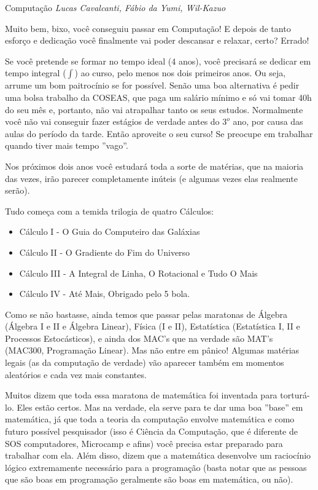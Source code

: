 \begin{subsecao}{Computação}
{\em Lucas Cavalcanti, Fábio da Yumi, Wil-Kazuo}

Muito bem, bixo, você conseguiu passar em Computação! E depois de tanto esforço
e dedicação você finalmente vai poder descansar e relaxar, certo? Errado!

Se você pretende se formar no tempo ideal (4 anos), você precisará se dedicar
em tempo integral ($\int$) ao curso, pelo menos nos dois primeiros anos. Ou
seja, arrume um bom paitrocínio se for possível. Senão uma boa alternativa é
pedir uma bolsa trabalho da COSEAS, que paga um salário mínimo e só vai
tomar 40h do seu mês e, portanto, não vai atrapalhar tanto os seus estudos.
Normalmente você não vai conseguir fazer estágios de verdade antes do $3^{o}$
ano, por causa das aulas do período da tarde. Então aproveite o seu curso! Se
preocupe em trabalhar quando tiver mais tempo ''vago''.

Nos próximos dois anos você estudará toda a sorte de matérias, que na maioria
das vezes, irão parecer completamente inúteis (e algumas vezes elas realmente
serão).

Tudo começa com a temida trilogia de quatro Cálculos:
\begin{itemize}
\item Cálculo I - O Guia do Computeiro das Galáxias
\item Cálculo II - O Gradiente do Fim do Universo
\item Cálculo III - A Integral de Linha, O Rotacional e Tudo O Mais
\item Cálculo IV - Até Mais, Obrigado pelo 5 bola.
\end{itemize}

Como se não bastasse, ainda temos que passar pelas maratonas
de Álgebra (Álgebra I e II e Álgebra Linear), Física (I e II),
Estatística (Estatística I, II e Processos Estocásticos), e ainda dos MAC's que
na verdade são MAT's (MAC300, Programação Linear). Mas não entre em pânico!
Algumas matérias legais (as da computação de verdade) vão aparecer também em
momentos aleatórios e cada vez mais constantes.

Muitos dizem que toda essa maratona de matemática foi inventada para
torturá-lo. Eles estão certos. Mas na verdade, ela serve para te dar uma
boa ''base'' em matemática, já que toda a teoria da computação envolve
matemática e como futuro possível pesquisador (isso é Ciência da Computação,
que é diferente de SOS computadores, Microcamp e afins) você precisa estar
preparado para trabalhar com ela. Além disso, dizem que a matemática desenvolve
um raciocínio lógico extremamente necessário para a programação (basta notar
que as pessoas que são boas em programação geralmente são boas em matemática,
ou não).


\end{subsecao}
